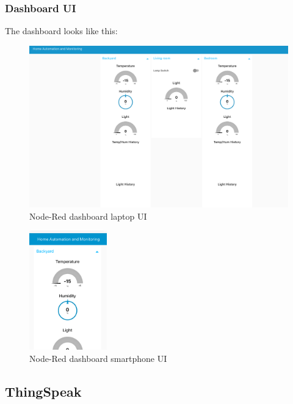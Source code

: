 \subsubsection{Dashboard UI}
The dashboard looks like this:

\begin{figure}[H]
	\begin{center}
		\includegraphics[width=1.0\textwidth]{./pictures/laptop_dashboard}
		\caption{Node-Red dashboard laptop UI}
		\label{mqtt_functioning}
	\end{center}
\end{figure}

\begin{figure}[H]
	\begin{center}
		\includegraphics[width=0.3\textwidth]{./pictures/smartphone_dashboard.PNG}
		\caption{Node-Red dashboard smartphone UI}
		\label{mqtt_functioning}
	\end{center}
\end{figure}

\subsection{ThingSpeak}

